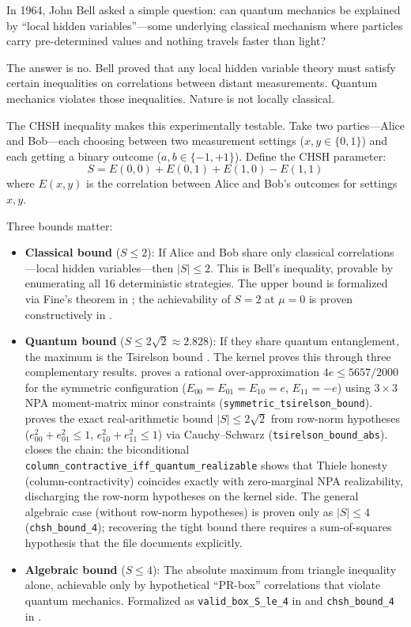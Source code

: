 In 1964, John Bell \cite{bell1964einstein} asked a simple question: can quantum mechanics be explained by ``local hidden variables''---some underlying classical mechanism where particles carry pre-determined values and nothing travels faster than light?

The answer is no. Bell proved that any local hidden variable theory must satisfy certain inequalities on correlations between distant measurements. Quantum mechanics violates those inequalities. Nature is not locally classical.

The CHSH inequality \cite{clauser1969proposed} makes this experimentally testable. Take two parties---Alice and Bob---each choosing between two measurement settings ($x, y \in \{0, 1\}$) and each getting a binary outcome ($a, b \in \{-1, +1\}$). Define the CHSH parameter:
\[
S = E(0,0) + E(0,1) + E(1,0) - E(1,1)
\]
where $E(x,y)$ is the correlation between Alice and Bob's outcomes for settings $x, y$.

Three bounds matter:
\begin{itemize}
    \item \textbf{Classical bound} ($S \le 2$): If Alice and Bob share only classical correlations---local hidden variables---then $|S| \le 2$. This is Bell's inequality, provable by enumerating all 16 deterministic strategies. The upper bound is formalized via Fine's theorem in ; the achievability of $S = 2$ at $\mu = 0$ is proven constructively in .
    \item \textbf{Quantum bound} ($S \le 2\sqrt{2} \approx 2.828$): If they share quantum entanglement, the maximum is the Tsirelson bound \cite{tsirelson1980quantum}. The kernel proves this through three complementary results.  proves a rational over-approximation $4e \le 5657/2000$ for the symmetric configuration ($E_{00}=E_{01}=E_{10}=e$, $E_{11}=-e$) using $3\times 3$ NPA moment-matrix minor constraints (\texttt{symmetric\_tsirelson\_bound}).  proves the exact real-arithmetic bound $|S| \le 2\sqrt{2}$ from row-norm hypotheses ($e_{00}^2 + e_{01}^2 \le 1$, $e_{10}^2 + e_{11}^2 \le 1$) via Cauchy--Schwarz (\texttt{tsirelson\_bound\_abs}).  closes the chain: the biconditional \texttt{column\_contractive\_iff\_quantum\_realizable} shows that Thiele honesty (column-contractivity) coincides exactly with zero-marginal NPA realizability, discharging the row-norm hypotheses on the kernel side. The general algebraic case (without row-norm hypotheses) is proven only as $|S| \le 4$ (\texttt{chsh\_bound\_4}); recovering the tight bound there requires a sum-of-squares hypothesis that the file documents explicitly.
    \item \textbf{Algebraic bound} ($S \le 4$): The absolute maximum from triangle inequality alone, achievable only by hypothetical ``PR-box'' correlations that violate quantum mechanics. Formalized as \texttt{valid\_box\_S\_le\_4} in  and \texttt{chsh\_bound\_4} in .
\end{itemize}

